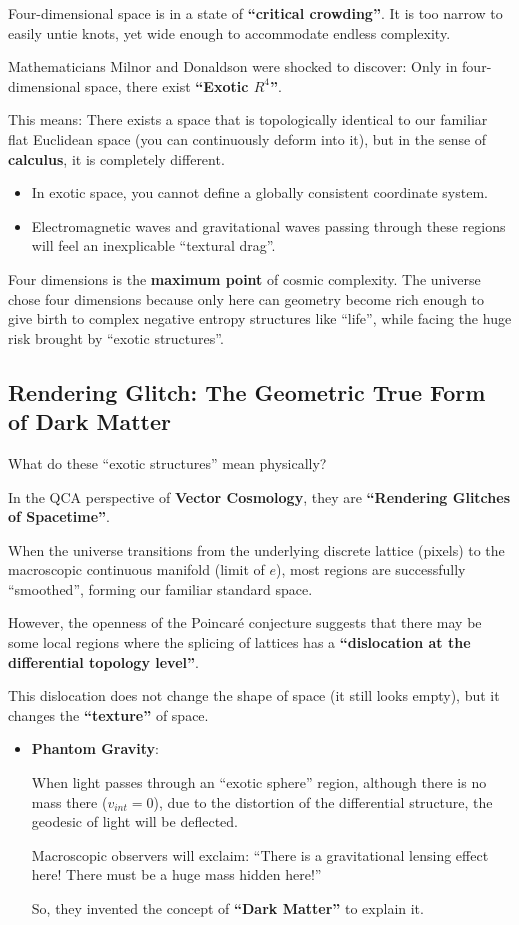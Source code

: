Four-dimensional space is in a state of \textbf{``critical crowding''}. It is too narrow to easily untie knots, yet wide enough to accommodate endless complexity.

Mathematicians Milnor and Donaldson were shocked to discover: Only in four-dimensional space, there exist \textbf{``Exotic $R^4$''}.

This means: There exists a space that is topologically identical to our familiar flat Euclidean space (you can continuously deform into it), but in the sense of \textbf{calculus}, it is completely different.

\begin{itemize}
\item In exotic space, you cannot define a globally consistent coordinate system.

\item Electromagnetic waves and gravitational waves passing through these regions will feel an inexplicable ``textural drag''.
\end{itemize}

Four dimensions is the \textbf{maximum point} of cosmic complexity. The universe chose four dimensions because only here can geometry become rich enough to give birth to complex negative entropy structures like ``life'', while facing the huge risk brought by ``exotic structures''.

\subsection{Rendering Glitch: The Geometric True Form of Dark Matter}

What do these ``exotic structures'' mean physically?

In the QCA perspective of \textbf{Vector Cosmology}, they are \textbf{``Rendering Glitches of Spacetime''}.

When the universe transitions from the underlying discrete lattice (pixels) to the macroscopic continuous manifold (limit of $e$), most regions are successfully ``smoothed'', forming our familiar standard space.

However, the openness of the Poincaré conjecture suggests that there may be some local regions where the splicing of lattices has a \textbf{``dislocation at the differential topology level''}.

This dislocation does not change the shape of space (it still looks empty), but it changes the \textbf{``texture''} of space.

\begin{itemize}
\item \textbf{Phantom Gravity}:

    When light passes through an ``exotic sphere'' region, although there is no mass there ($v_{int}=0$), due to the distortion of the differential structure, the geodesic of light will be deflected.

    Macroscopic observers will exclaim: ``There is a gravitational lensing effect here! There must be a huge mass hidden here!''

    So, they invented the concept of \textbf{``Dark Matter''} to explain it.
\end{itemize}

